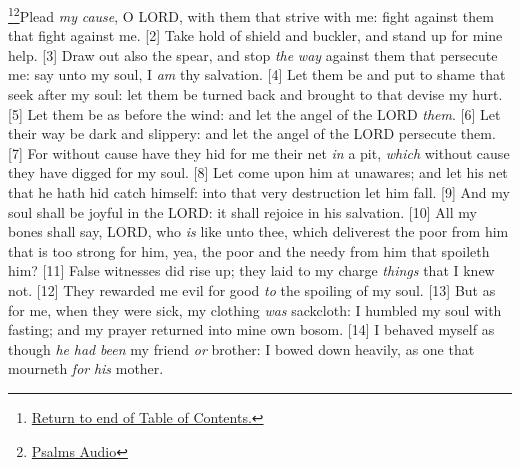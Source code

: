 \footnote{\textcolor[cmyk]{0.99998,1,0,0}{\hyperlink{TOC}{Return to end of Table of Contents.}}}\footnote{\href{https://www.audioverse.org/english/audiobibles/books/ENGKJV/O/Ps/1}{\textcolor[cmyk]{0.99998,1,0,0}{Psalms Audio}}}\textcolor[cmyk]{0.99998,1,0,0}{Plead \emph{my} \emph{cause}, O LORD, with them that strive with me: fight against them that fight against me.}\marginpar{\scriptsize \textcolor[rgb]{0.00,0.545,0.269}{$\rightarrow$(1) Strife [1], (2) Shield [2], (3) Spear [3], (4) Salvation [3], (5) Shame [4], (6) Slipping [6], (7) Spoiling [10].}}
[2] \textcolor[cmyk]{0.99998,1,0,0}{Take hold of shield and buckler, and stand up for mine help.}
[3] \textcolor[cmyk]{0.99998,1,0,0}{Draw out also the spear, and stop \emph{the} \emph{way} against them that persecute me: say unto my soul, I \emph{am} thy salvation.}
[4] \textcolor[cmyk]{0.99998,1,0,0}{Let them be  and put to shame that seek after my soul: let them be turned back and brought to  that devise my hurt.}
[5] \textcolor[cmyk]{0.99998,1,0,0}{Let them be as  before the wind: and let the angel of the LORD  \emph{them}.}
[6] \textcolor[cmyk]{0.99998,1,0,0}{Let their way be dark and slippery: and let the angel of the LORD persecute them.}
[7] \textcolor[cmyk]{0.99998,1,0,0}{For without cause have they hid for me their net \emph{in} a pit, \emph{which} without cause they have digged for my soul.}
[8] \textcolor[cmyk]{0.99998,1,0,0}{Let  come upon him at unawares; and let his net that he hath hid catch himself: into that very destruction let him fall.}
[9] \textcolor[cmyk]{0.99998,1,0,0}{And my soul shall be joyful in the LORD: it shall rejoice in his salvation.}
[10] \textcolor[cmyk]{0.99998,1,0,0}{All my bones shall say, LORD, who \emph{is} like unto thee, which deliverest the poor from him that is too strong for him, yea, the poor and the needy from him that spoileth him?}
[11] \textcolor[cmyk]{0.99998,1,0,0}{False witnesses did rise up; they laid to my charge \emph{things} that I knew not.}
[12] \textcolor[cmyk]{0.99998,1,0,0}{They rewarded me evil for good \emph{to} the spoiling of my soul.}
[13] \textcolor[cmyk]{0.99998,1,0,0}{But as for me, when they were sick, my clothing \emph{was} sackcloth: I humbled my soul with fasting; and my prayer returned into mine own bosom.}
[14] \textcolor[cmyk]{0.99998,1,0,0}{I behaved myself as though \emph{he} \emph{had} \emph{been} my friend \emph{or} brother: I bowed down heavily, as one that mourneth \emph{for} \emph{his} mother.}
